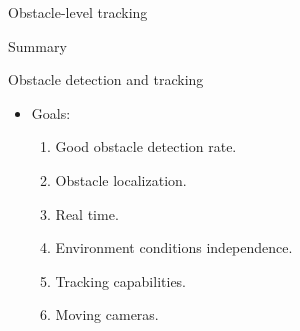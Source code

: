 \begin{frame}{Obstacle-level tracking}
  \note {

  }
\end{frame}

\begin{frame}{Summary}
 \begin{figure}
 \end{figure}
\end{frame}

\begin{frame}{Obstacle detection and tracking}
  \begin{itemize}
  \item Goals:
    \begin{enumerate}
      \item Good obstacle detection rate. 
      \item Obstacle localization. \only<3->{\textcolor{green}{\cmark}}
      \item Real time. 
      \item Environment conditions independence. 
      \item Tracking capabilities. 
      \item Moving cameras. 
    \end{enumerate}
  \end{itemize}
\end{frame}